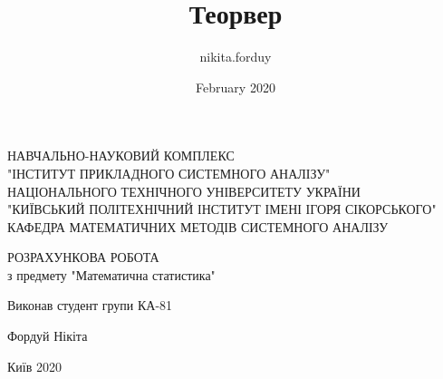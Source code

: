 \documentclass{article}
\title{Теорвер}
\author{nikita.forduy }
\date{February 2020}
\begin{document}
\pagestyle{empty}

\begin{titlepage}
    \thispagestyle{empty}
    \setlength{\parindent}{0ex} %
    
    \begin{center}
      НАВЧАЛЬНО-НАУКОВИЙ КОМПЛЕКС \\
      "ІНСТИТУТ ПРИКЛАДНОГО СИСТЕМНОГО АНАЛІЗУ" \\
      НАЦІОНАЛЬНОГО ТЕХНІЧНОГО УНІВЕРСИТЕТУ УКРАЇНИ \\
      "КИЇВСЬКИЙ ПОЛІТЕХНІЧНИЙ ІНСТИТУТ ІМЕНІ ІГОРЯ СІКОРСЬКОГО" \\
      \smallskip
      КАФЕДРА МАТЕМАТИЧНИХ МЕТОДІВ СИСТЕМНОГО АНАЛІЗУ \\
    \end{center}
    \vspace{60mm}
    
    \begin{center}
      РОЗРАХУНКОВА РОБОТА \\
      з предмету "Математична статистика" \\
    \end{center}
    
    \vspace{30mm}
    

    \hfill
    \begin{minipage}{.4\linewidth}
      \begin{flushright}
        Виконав студент групи КА-81
    
        \smallskip
    
        Фордуй Нікіта
      \end{flushright}
    \end{minipage}
    
    \vspace{10mm}

    \vfill
    \begin{center}
      Київ 2020
    \end{center}
    
    \setlength{\parindent}{5ex} %
\end{titlepage}

\pagestyle{plain}

\large
\end{document}
